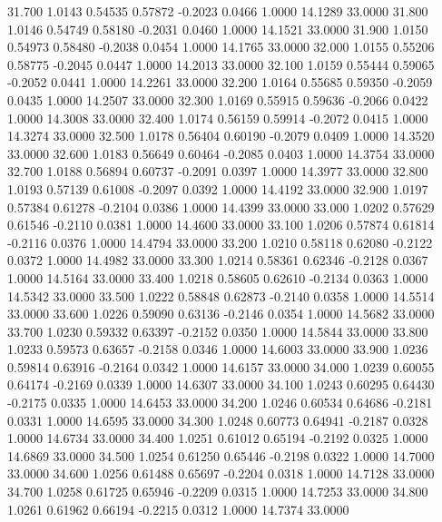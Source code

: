   31.700   1.0143   0.54535   0.57872  -0.2023   0.0466   1.0000  14.1289  33.0000
  31.800   1.0146   0.54749   0.58180  -0.2031   0.0460   1.0000  14.1521  33.0000
  31.900   1.0150   0.54973   0.58480  -0.2038   0.0454   1.0000  14.1765  33.0000
  32.000   1.0155   0.55206   0.58775  -0.2045   0.0447   1.0000  14.2013  33.0000
  32.100   1.0159   0.55444   0.59065  -0.2052   0.0441   1.0000  14.2261  33.0000
  32.200   1.0164   0.55685   0.59350  -0.2059   0.0435   1.0000  14.2507  33.0000
  32.300   1.0169   0.55915   0.59636  -0.2066   0.0422   1.0000  14.3008  33.0000
  32.400   1.0174   0.56159   0.59914  -0.2072   0.0415   1.0000  14.3274  33.0000
  32.500   1.0178   0.56404   0.60190  -0.2079   0.0409   1.0000  14.3520  33.0000
  32.600   1.0183   0.56649   0.60464  -0.2085   0.0403   1.0000  14.3754  33.0000
  32.700   1.0188   0.56894   0.60737  -0.2091   0.0397   1.0000  14.3977  33.0000
  32.800   1.0193   0.57139   0.61008  -0.2097   0.0392   1.0000  14.4192  33.0000
  32.900   1.0197   0.57384   0.61278  -0.2104   0.0386   1.0000  14.4399  33.0000
  33.000   1.0202   0.57629   0.61546  -0.2110   0.0381   1.0000  14.4600  33.0000
  33.100   1.0206   0.57874   0.61814  -0.2116   0.0376   1.0000  14.4794  33.0000
  33.200   1.0210   0.58118   0.62080  -0.2122   0.0372   1.0000  14.4982  33.0000
  33.300   1.0214   0.58361   0.62346  -0.2128   0.0367   1.0000  14.5164  33.0000
  33.400   1.0218   0.58605   0.62610  -0.2134   0.0363   1.0000  14.5342  33.0000
  33.500   1.0222   0.58848   0.62873  -0.2140   0.0358   1.0000  14.5514  33.0000
  33.600   1.0226   0.59090   0.63136  -0.2146   0.0354   1.0000  14.5682  33.0000
  33.700   1.0230   0.59332   0.63397  -0.2152   0.0350   1.0000  14.5844  33.0000
  33.800   1.0233   0.59573   0.63657  -0.2158   0.0346   1.0000  14.6003  33.0000
  33.900   1.0236   0.59814   0.63916  -0.2164   0.0342   1.0000  14.6157  33.0000
  34.000   1.0239   0.60055   0.64174  -0.2169   0.0339   1.0000  14.6307  33.0000
  34.100   1.0243   0.60295   0.64430  -0.2175   0.0335   1.0000  14.6453  33.0000
  34.200   1.0246   0.60534   0.64686  -0.2181   0.0331   1.0000  14.6595  33.0000
  34.300   1.0248   0.60773   0.64941  -0.2187   0.0328   1.0000  14.6734  33.0000
  34.400   1.0251   0.61012   0.65194  -0.2192   0.0325   1.0000  14.6869  33.0000
  34.500   1.0254   0.61250   0.65446  -0.2198   0.0322   1.0000  14.7000  33.0000
  34.600   1.0256   0.61488   0.65697  -0.2204   0.0318   1.0000  14.7128  33.0000
  34.700   1.0258   0.61725   0.65946  -0.2209   0.0315   1.0000  14.7253  33.0000
  34.800   1.0261   0.61962   0.66194  -0.2215   0.0312   1.0000  14.7374  33.0000
